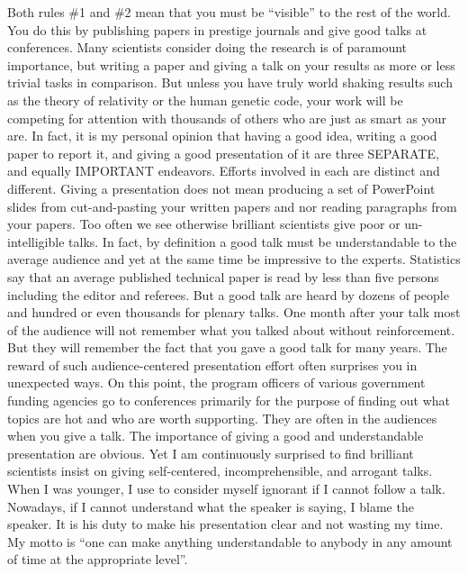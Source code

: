 \documentclass{article}
\begin{document}
Both rules \#1 and \#2 mean that you must be “visible” to the rest of the world. You do this by publishing papers in prestige journals and give good talks at conferences. Many scientists consider doing the research is of paramount importance, but writing a paper and giving a talk on your results as more or less trivial tasks in comparison. But unless you have truly world shaking results such as the theory of relativity or the human genetic code, your work will be competing for attention with thousands of others who are just as smart as your are. In fact, it is my personal opinion that having a good idea, writing a good paper to report it, and giving a good presentation of it are three SEPARATE, and equally IMPORTANT endeavors. Efforts involved in each are distinct and different. Giving a presentation does not mean producing a set of PowerPoint slides  from cut-and-pasting your written papers and nor reading paragraphs from your papers. Too often we see otherwise brilliant scientists give poor or un-intelligible talks.  In fact, by definition a good talk must be understandable to the average audience and yet at the same time be impressive to the experts.  Statistics say that an average published technical paper is read by less than five persons including the editor and referees. But a good talk are heard by dozens of people and hundred or even thousands for plenary talks.  One month after your talk most of the audience will not remember what you talked about without reinforcement. But they will remember the fact that you gave a good talk for many years. The reward of such audience-centered presentation effort often surprises you in unexpected ways. On this point, the program officers of various government funding agencies go to conferences primarily for the purpose of finding out what topics are hot and who are worth supporting. They are often in the audiences when you give a talk. The importance of giving a good and understandable presentation are obvious.  Yet I am continuously surprised to find brilliant scientists insist on giving self-centered, incomprehensible, and arrogant talks. When I was younger, I use to consider myself ignorant if I cannot follow a talk. Nowadays, if I cannot understand what the speaker is saying, I blame the speaker. It is his duty to make his presentation clear and not wasting my time. My motto is “one can make anything understandable to anybody in any amount of time at the appropriate level”.
\end{document}
